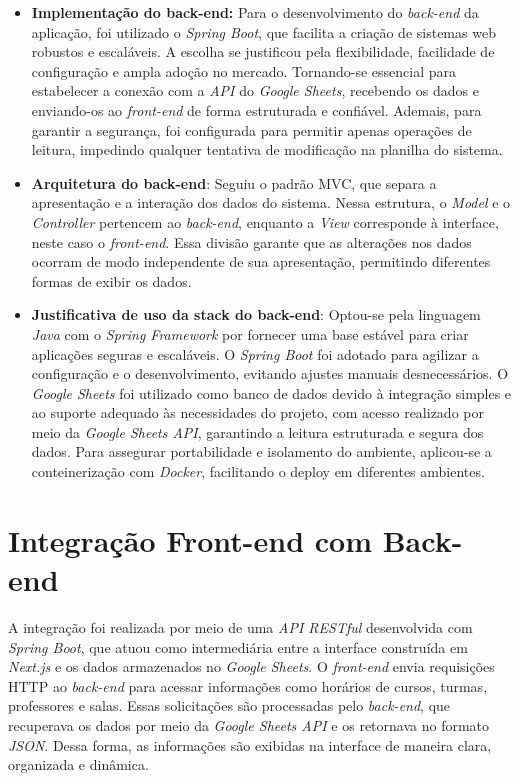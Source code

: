 \begin{itemize}
    \item \textbf{Implementação do back-end:} Para o desenvolvimento do \textit{back-end} da aplicação, foi utilizado o \textit{Spring Boot}, que facilita a criação de sistemas web robustos e escaláveis. A escolha se justificou pela flexibilidade, facilidade de configuração e ampla adoção no mercado. Tornando-se essencial para estabelecer a conexão com a \textit{API} do \textit{Google Sheets}, recebendo os dados e enviando-os ao \textit{front-end} de forma estruturada e confiável. Ademais, para garantir a segurança, foi configurada para permitir apenas operações de leitura, impedindo qualquer tentativa de modificação na planilha do sistema.
    \item \textbf{Arquitetura do back-end}: Seguiu o padrão MVC, que separa a apresentação e a interação dos dados do sistema. Nessa estrutura, o \textit{Model} e o \textit{Controller} pertencem ao \textit{back-end}, enquanto a \textit{View} corresponde à interface, neste caso o \textit{front-end}. Essa divisão garante que as alterações nos dados ocorram de modo independente de sua apresentação, permitindo diferentes formas de exibir os dados.
    \item \textbf{Justificativa de uso da stack do back-end}: Optou-se pela linguagem \textit{Java} com o \textit{Spring Framework} por fornecer uma base estável para criar aplicações seguras e escaláveis. O \textit{Spring Boot} foi adotado para agilizar a configuração e o desenvolvimento, evitando ajustes manuais desnecessários. O \textit{Google Sheets} foi utilizado como banco de dados devido à integração simples e ao suporte adequado às necessidades do projeto, com acesso realizado por meio da \textit{Google Sheets API}, garantindo a leitura estruturada e segura dos dados. Para assegurar portabilidade e isolamento do ambiente, aplicou-se a conteinerização com \textit{Docker}, facilitando o deploy em diferentes ambientes.
\end{itemize}

\section{Integração Front-end com Back-end}

A integração foi realizada por meio de uma \textit{API RESTful} desenvolvida com \textit{Spring Boot}, que atuou como intermediária entre a interface construída em \textit{Next.js} e os dados armazenados no \textit{Google Sheets}. O \textit{front-end} envia requisições HTTP ao \textit{back-end} para acessar informações como horários de cursos, turmas, professores e salas. Essas solicitações são processadas pelo \textit{back-end}, que recuperava os dados por meio da \textit{Google Sheets API} e os retornava no formato \textit{JSON}. Dessa forma, as informações são exibidas na interface de maneira clara, organizada e dinâmica.

